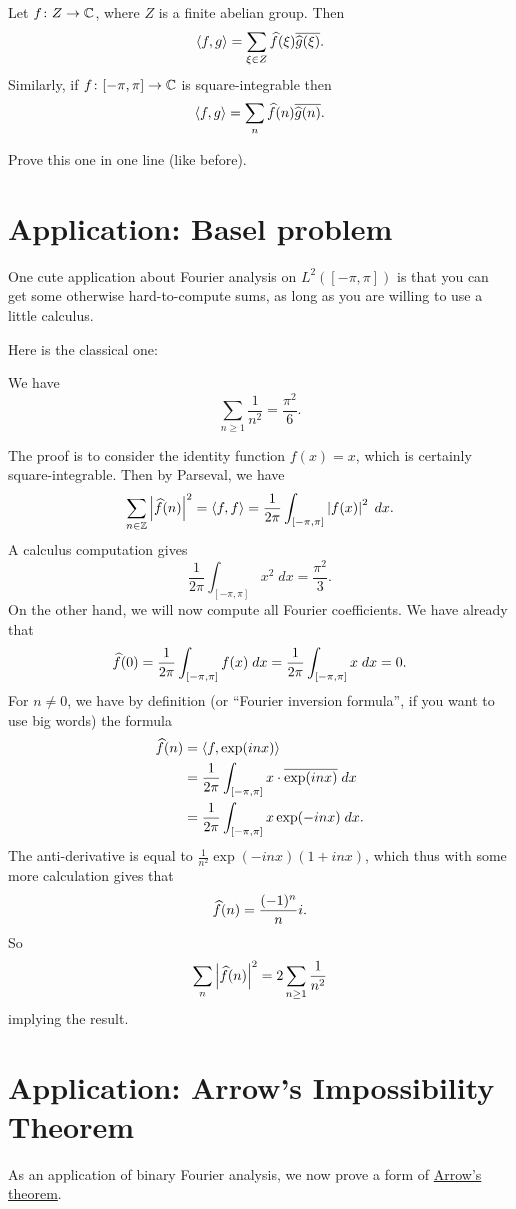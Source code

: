 \begin{corollary}
	Let $f \colon Z \to \mathbb C$, where $Z$ is a finite abelian group.
	Then \[ \left< f,g \right> = \sum_{\xi \in Z} \widehat f(\xi) \overline{\widehat g(\xi)}. \]
	Similarly, if $f \colon [-\pi, \pi] \to \mathbb C$ is square-integrable then
	\[ \left< f,g \right> = \sum_n \widehat f(n) \overline{\widehat g(n)}. \]
\end{corollary}
\begin{ques}
	Prove this one in one line (like before).
\end{ques}

\section{Application: Basel problem}
One cute application about Fourier analysis on $L^2([-\pi, \pi])$
is that you can get some otherwise hard-to-compute sums,
as long as you are willing to use a little calculus.

Here is the classical one:
\begin{theorem}
	We have
	\[ \sum_{n \ge 1} \frac{1}{n^2} = \frac{\pi^2}{6}. \]
\end{theorem}
The proof is to consider the identity function $f(x) = x$,
which is certainly square-integrable.
Then by Parseval, we have
\[
	\sum_{n \in \mathbb Z} \left\lvert \widehat f(n) \right\rvert^2
	= \left< f,f\right>
	= \frac{1}{2\pi} \int_{[-\pi, \pi]} \left\lvert f(x) \right\rvert^2 \; dx.
\]
A calculus computation gives
\[  \frac{1}{2\pi} \int_{[-\pi, \pi]} x^2 \; dx = \frac{\pi^2}{3}. \]
On the other hand, we will now compute all Fourier coefficients.
We have already that
\[ \widehat f(0) = \frac{1}{2\pi} \int_{[-\pi, \pi]} f(x) \; dx
	= \frac{1}{2\pi} \int_{[-\pi, \pi]} x \; dx = 0. \]
For $n \neq 0$, we have by definition
(or ``Fourier inversion formula'', if you want to use big words)
the formula
\begin{align*}
	\widehat f(n) &= \left< f, \exp(inx) \right> \\
	&= \frac{1}{2\pi} \int_{[-\pi, \pi]} x \cdot \overline{\exp(inx)} \; dx \\
	&= \frac{1}{2\pi} \int_{[-\pi, \pi]} x \exp(-inx) \; dx.
\end{align*}
The anti-derivative is equal to
$\frac{1}{n^2} \exp(-inx) (1+inx)$,
which thus with some more calculation gives that
\[ \widehat f(n) = \frac{(-1)^n}{n} i. \]
So
\[ \sum_n \left\lvert \widehat f(n) \right\rvert^2
	= 2 \sum_{n \ge 1} \frac{1}{n^2} \]
implying the result.

\section{Application: Arrow's Impossibility Theorem}
As an application of binary Fourier analysis,
we now prove a form of
\href{https://en.wikipedia.org/wiki/Arrow's_impossibility_theorem}{Arrow's theorem}.

